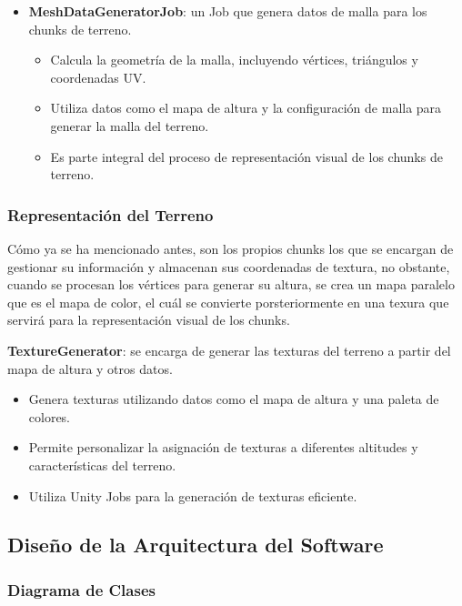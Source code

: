 \begin{itemize}
    \item \textbf{MeshDataGeneratorJob}: un Job que genera datos de malla para los chunks de terreno.
    \begin{itemize}
        \item Calcula la geometría de la malla, incluyendo vértices, triángulos y coordenadas UV.
        \item Utiliza datos como el mapa de altura y la configuración de malla para generar la malla del terreno.
        \item Es parte integral del proceso de representación visual de los chunks de terreno.
    \end{itemize}

\end{itemize}

\subsubsection{Representación del Terreno}

Cómo ya se ha mencionado antes, son los propios chunks los que se encargan de gestionar su información y almacenan sus coordenadas de textura, no obstante, cuando se procesan los vértices para generar su altura, se crea un mapa paralelo que es el mapa de color, el cuál se convierte porsteriormente en una texura que servirá para la representación visual de los chunks.

\item \textbf{TextureGenerator}: se encarga de generar las texturas del terreno a partir del mapa de altura y otros datos.
\begin{itemize}
    \item Genera texturas utilizando datos como el mapa de altura y una paleta de colores.
    \item Permite personalizar la asignación de texturas a diferentes altitudes y características del terreno.
    \item Utiliza Unity Jobs para la generación de texturas eficiente.
\end{itemize}

\subsection{Diseño de la Arquitectura del Software}

\subsubsection{Diagrama de Clases}

